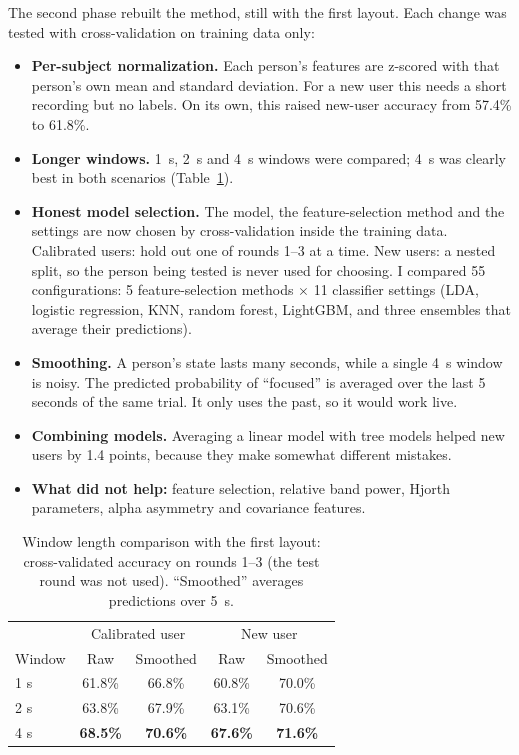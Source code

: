 \documentclass[12pt]{article}
\begin{document}
The second phase rebuilt the method, still with the first layout. Each change was tested with cross-validation on training data only:
\begin{itemize}
    \item \textbf{Per-subject normalization.} Each person's features are z-scored with that person's own mean and standard deviation. For a new user this needs a short recording but no labels. On its own, this raised new-user accuracy from 57.4\% to 61.8\%.
    \item \textbf{Longer windows.} 1~s, 2~s and 4~s windows were compared; 4~s was clearly best in both scenarios (Table~\ref{tab:windows}).
    \item \textbf{Honest model selection.} The model, the feature-selection method and the settings are now chosen by cross-validation inside the training data. Calibrated users: hold out one of rounds 1--3 at a time. New users: a nested split, so the person being tested is never used for choosing. I compared 55 configurations: 5 feature-selection methods $\times$ 11 classifier settings (LDA, logistic regression, KNN, random forest, LightGBM, and three ensembles that average their predictions).
    \item \textbf{Smoothing.} A person's state lasts many seconds, while a single 4~s window is noisy. The predicted probability of ``focused'' is averaged over the last 5 seconds of the same trial. It only uses the past, so it would work live.
    \item \textbf{Combining models.} Averaging a linear model with tree models helped new users by 1.4 points, because they make somewhat different mistakes.
    \item \textbf{What did not help:} feature selection, relative band power, Hjorth parameters, alpha asymmetry and covariance features.
\end{itemize}

\begin{table}[H]
\centering
\caption{Window length comparison with the first layout: cross-validated accuracy on rounds 1--3 (the test round was not used). ``Smoothed'' averages predictions over 5~s.}
\label{tab:windows}
\begin{tabular}{lcccc}
\toprule
 & \multicolumn{2}{c}{Calibrated user} & \multicolumn{2}{c}{New user} \\
Window & Raw & Smoothed & Raw & Smoothed \\
\midrule
1 s & 61.8\% & 66.8\% & 60.8\% & 70.0\% \\
2 s & 63.8\% & 67.9\% & 63.1\% & 70.6\% \\
4 s & \textbf{68.5\%} & \textbf{70.6\%} & \textbf{67.6\%} & \textbf{71.6\%} \\
\bottomrule
\end{tabular}
\end{table}
\end{document}
